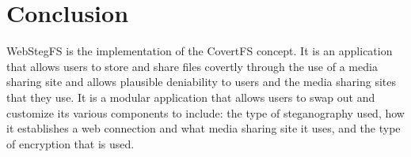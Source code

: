 \documentclass[12pt,journal,compsoc]{IEEEtran}
\begin{document}
\section{Conclusion}

WebStegFS is the implementation of the CovertFS concept. It is an application that allows users to store and share files covertly through the use of a media sharing site and allows plausible deniability to users and the media sharing sites that they use. It is a modular application that allows users to swap out and customize its various components to include: the type of steganography used, how it establishes a web connection and what media sharing site it uses, and the type of encryption that is used. 



\end{document}

